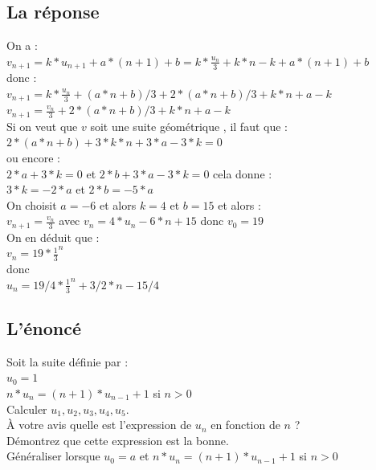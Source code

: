 \documentclass[a4paper,11pt]{book}
\begin{document}
\subsection{La r\'eponse}
On a :\\
$v_{n+1}=k*u_{n+1}+a*(n+1)+b=k*\frac{u_n}{3}+k*n-k+a*(n+1)+b$\\
donc :\\
$\displaystyle v_{n+1}=k*\frac{u_n}{3}+(a*n+b)/3+2*(a*n+b)/3+k*n+a-k$\\
$\displaystyle v_{n+1}=\frac{v_n}{3}+2*(a*n+b)/3+k*n+a-k$\\
Si on veut que $v$ soit une suite g\'eom\'etrique , il faut que :\\
$2*(a*n+b)+3*k*n+3*a-3*k=0$\\
ou encore :\\
$2*a+3*k=0$ et $2*b+3*a-3*k=0$ 
cela donne :\\
$3*k=-2*a$ et  $2*b=-5*a$\\
On choisit $a=-6$ et alors $k=4$ et $b=15$ et alors :\\
$\displaystyle v_{n+1}=\frac{v_n}{3}$ avec $v_n=4*u_n-6*n+15$ donc $v_0=19$\\
On en d\'eduit que :\\
$\displaystyle v_n= 19*\frac{1}{3}^n$\\
donc\\
$\displaystyle u_n= 19/4*\frac{1}{3}^n+3/2*n-15/4$

\subsection{L'\'enonc\'e}
Soit la suite d\'efinie par :\\
$u_0=1$\\
$n*u_{n}=(n+1)*u_{n-1}+1$ si $n>0$\\
Calculer $u_1,u_2,u_3,u_4,u_5$.\\
\`A votre avis quelle est l'expression de $u_n$ en fonction de $n$ ?\\
D\'emontrez que cette expression est la bonne.\\
G\'en\'eraliser lorsque $u_0=a$ et $n*u_{n}=(n+1)*u_{n-1}+1$ si $n>0$\\
\end{document}
